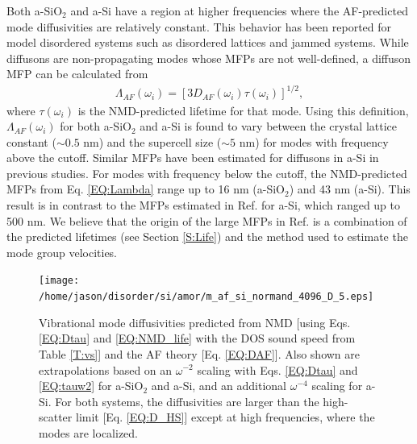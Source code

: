 \documentclass[aps,prb,onecolumn,preprint,superscriptaddress,footinbib,amsmath,amssymb,floatfix]{revtex4}
\begin{document}
Both a-SiO$_2$ and a-Si have a region at higher frequencies where 
the AF-predicted mode diffusivities are relatively constant. This 
behavior has been reported for model disordered systems such as 
disordered lattices\cite{sheng_heat_1991,beltukov_ioffe-regel_2013,
larkin_predicting_2013} and jammed systems.
\cite{xu_energy_2009,vitelli_heat_2010}  
While diffusons are non-propagating modes whose MFPs are not 
well-defined,\cite{feldman_thermal_1993} 
a diffuson MFP can be calculated from 
\begin{equation}\label{EQ:LambdaAF}
\begin{split}
\Lambda_{AF}(\omega_i) = [3D_{AF}(\omega_i)\tau(\omega_i)]^{1/2},
\end{split}
\end{equation}
where $\tau(\omega_{i})$ is the NMD-predicted lifetime for that mode. 
Using this definition, $\Lambda_{AF}(\omega_i)$ for both a-SiO$_2$ 
and a-Si is found to vary between the crystal lattice constant 
($\sim 0.5$ nm) and 
the supercell size ($\sim 5$ nm) 
for modes with frequency above the cutoff. 
Similar MFPs have been estimated for diffusons in a-Si in 
previous studies.\cite{feldman_thermal_1993,feldman_numerical_1999} 
For modes with frequency below the cutoff, the NMD-predicted 
MFPs from Eq. \eqref{EQ:Lambda} range up to 16 nm (a-SiO$_2$) 
and 43 nm (a-Si). This result is in contrast to the MFPs 
estimated in Ref.  for a-Si, which ranged 
up to 500 nm. We believe that the origin of the large MFPs 
in Ref.  is 
a combination of the predicted lifetimes (see Section \ref{S:Life}) 
and the method used to estimate the mode group velocities.

\begin{figure}
\begin{center}
\texttt{[image: /home/jason/disorder/si/amor/m\_af\_si\_normand\_4096\_D\_5.eps]}
\vspace*{-5mm}
\end{center}
\caption{\label{FIG:diffusivities} Vibrational mode diffusivities 
predicted from NMD [using Eqs. \eqref{EQ:Dtau} and 
\eqref{EQ:NMD_life} with the DOS sound speed from Table \ref{T:vs}] 
and the AF theory [Eq. \eqref{EQ:DAF}]. 
Also shown are  
extrapolations based on an $\omega^{-2}$ scaling with 
Eqs. \eqref{EQ:Dtau} and \eqref{EQ:tauw2} for a-SiO$_2$ and a-Si, 
and an additional $\omega^{-4}$ scaling for a-Si. For both systems, 
the diffusivities are larger than the high-scatter limit 
[Eq. \eqref{EQ:D_HS}] except at high frequencies, where the modes 
are localized.
}
\end{figure}
\vspace{20mm}
\end{document}
